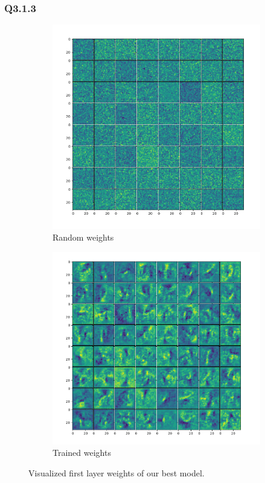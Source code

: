 \documentclass{article} %
\begin{document}
    \subsubsection*{Q3.1.3}
    \begin{figure}[H]
        \centering
        \begin{subfigure}[b]{0.49\textwidth}
            \includegraphics[width=\textwidth]{3,1,3 random weights copy.png}
            \caption{Random weights}
        \end{subfigure}
        \begin{subfigure}[b]{0.49\textwidth}
        \includegraphics[width=\textwidth]{3,1,3 trained weights copy.png}
            \caption{Trained weights}
        \end{subfigure}
        \caption{Visualized first layer weights of our best model.}
        \label{q313}
    \end{figure}
\end{document}
